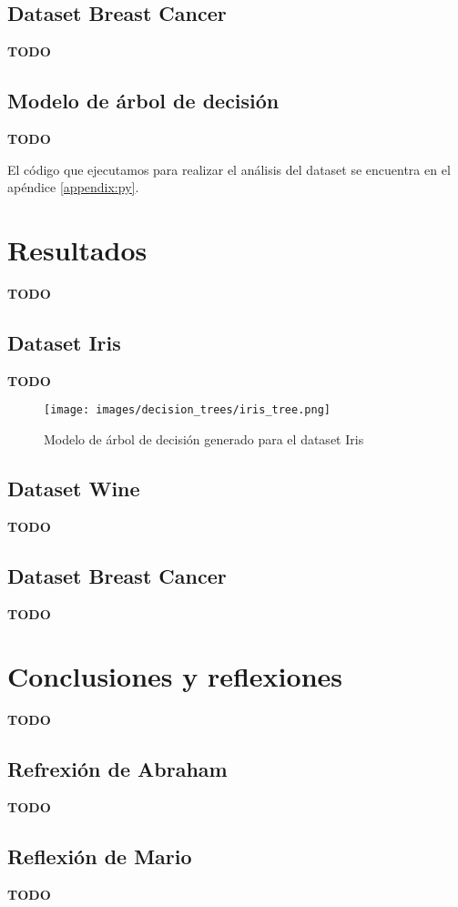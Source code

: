 \documentclass[sigconf,authorversion,nonacm]{acmart}
\begin{document}
\subsection{Dataset Breast Cancer}
\textbf{TODO}

\subsection{Modelo de árbol de decisión}
\textbf{TODO}

El código que ejecutamos para realizar el análisis del dataset se encuentra en el apéndice \ref{appendix:py}.


\section{Resultados}
\textbf{TODO}

\subsection{Dataset Iris}
\textbf{TODO}
\begin{figure}[H]
  \centering
  \texttt{[image: images/decision\_trees/iris\_tree.png]}
  \caption{Modelo de árbol de decisión generado para el dataset Iris}
\end{figure}

\subsection{Dataset Wine}
\textbf{TODO}

\subsection{Dataset Breast Cancer}
\textbf{TODO}


\section{Conclusiones y reflexiones}
\textbf{TODO}

\subsection{Refrexión de Abraham}
\textbf{TODO}

\subsection{Reflexión de Mario}
\textbf{TODO}
\end{document}
